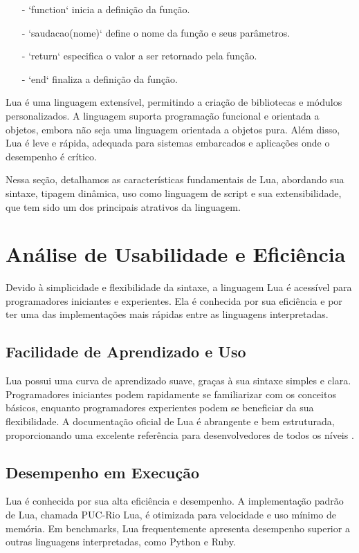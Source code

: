 \documentclass[12pt]{article}
\begin{document}
\begin{itemize}
  \item[-] `function` inicia a definição da função.
  \item[-] `saudacao(nome)` define o nome da função e seus parâmetros.
  \item[-] `return` especifica o valor a ser retornado pela função.
  \item[-] `end` finaliza a definição da função.
\end{itemize}

Lua é uma linguagem extensível, permitindo a criação de bibliotecas e módulos personalizados. A linguagem suporta programação funcional e orientada a objetos, embora não seja uma linguagem orientada a objetos pura. Além disso, Lua é leve e rápida, adequada para sistemas embarcados e aplicações onde o desempenho é crítico. 

Nessa seção, detalhamos as características fundamentais de Lua, abordando sua sintaxe, tipagem dinâmica, uso como linguagem de script e sua extensibilidade, que tem sido um dos principais atrativos da linguagem.

\section{Análise de Usabilidade e Eficiência}
Devido à simplicidade e flexibilidade da sintaxe, a linguagem Lua é acessível para programadores iniciantes e experientes. Ela é conhecida por sua eficiência e por ter uma das implementações mais rápidas entre as linguagens interpretadas. 

\subsection{Facilidade de Aprendizado e Uso}
Lua possui uma curva de aprendizado suave, graças à sua sintaxe simples e clara. Programadores iniciantes podem rapidamente se familiarizar com os conceitos básicos, enquanto programadores experientes podem se beneficiar da sua flexibilidade. A documentação oficial de Lua é abrangente e bem estruturada, proporcionando uma excelente referência para desenvolvedores de todos os níveis \cite{lua-edu}.

\subsection{Desempenho em Execução}
Lua é conhecida por sua alta eficiência e desempenho. A implementação padrão de Lua, chamada PUC-Rio Lua, é otimizada para velocidade e uso mínimo de memória. Em benchmarks, Lua frequentemente apresenta desempenho superior a outras linguagens interpretadas, como Python e Ruby. 
\end{document}
